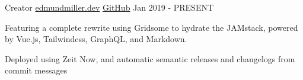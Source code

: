 \begin{cventries}

	\cventry
	{Creator} %
	{\href{https://github.com/emiller88/edmundmiller.dev}{edmundmiller.dev}} %
	{\href{https://github.com/Emiller88/edmundmiller.dev}{GitHub}} %
	{Jan 2019 - PRESENT} %
	{
		\begin{cvitems} %
			\item {Featuring a complete rewrite using Gridsome to hydrate the JAMstack, powered by Vue.js, Tailwindcss, GraphQL, and Markdown.}
			\item {Deployed using Zeit Now, and automatic semantic releases and
                    changelogs from commit messages}
		\end{cvitems}
	}

\end{cventries}
